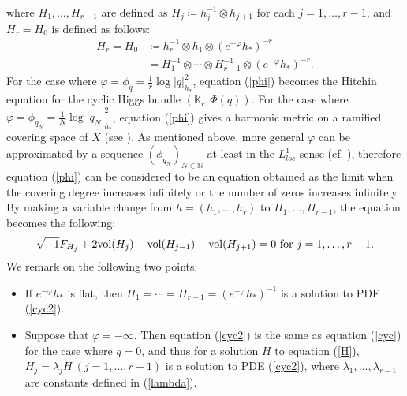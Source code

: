 \documentclass[12pt]{article}
\theoremstyle{definition}
\def\refe{\ast}
\def\vol{{\rm vol}}
\def\N{{\mathbb N}}
\def\K{{\mathbb K}}
\def\inum{{\sqrt{-1}}}
\begin{document}
where $H_1,\dots, H_{r-1}$ are defined as $H_j\coloneqq h_j^{-1}\otimes h_{j+1}$ for each $j=1,\dots, r-1$, and $H_r=H_0$ is defined as follows:
\begin{align*}
H_r = H_0 &\coloneqq h_r^{-1}\otimes h_1 \otimes (e^{-\varphi}h_\refe)^{-r} \\ 
&= H_1^{-1}\otimes \cdots \otimes H_{r-1}^{-1} \otimes (e^{-\varphi}h_\refe)^{-r}.
\end{align*}
For the case where $\varphi=\phi_q=\frac{1}{r}\log|q|_{h_\refe}^2$, equation (\ref{phi}) becomes the Hitchin equation for the cyclic Higgs bundle $(\K_r,\Phi(q))$. For the case where $\varphi=\phi_{q_N}=\frac{1}{N}\log|q_N|_{h_\refe}^2$, equation (\ref{phi}) gives a harmonic metric on a ramified covering space of $X$ (see \cite[Section 2]{Miy2}). As mentioned above, more general $\varphi$ can be approximated by a sequence $(\phi_{q_N})_{N\in\N}$ at least in the $L^1_{loc}$-sense (cf. \cite{GZ1}), therefore equation (\ref{phi}) can be considered to be an equation obtained as the limit when the covering degree increases infinitely or the number of zeros increases infinitely. By making a variable change from $h=(h_1,\dots, h_r)$ to $H_1,\dots, H_{r-1}$, the equation becomes the following:
\begin{align}
\inum F_{H_j} + 2\vol(H_j) - \vol(H_{j-1}) - \vol(H_{j+1}) = 0 \ \text{for $j=1,\dots, r-1$.}\label{cyc2}
\end{align}
We remark on the following two points:
\begin{itemize}
\item If $e^{-\varphi}h_\refe$ is flat, then $H_1=\cdots=H_{r-1}=(e^{-\varphi}h_\refe)^{-1}$ is a solution to PDE (\ref{cyc2}).
\item Suppose that $\varphi=-\infty$. Then equation (\ref{cyc2}) is the same as equation (\ref{cyc}) for the case where $q=0$, and thus for a solution $H$ to equation (\ref{H}), $H_j=\lambda_j H\ (j=1,\dots, r-1)$ is a solution to PDE (\ref{cyc2}), where $\lambda_1,\dots, \lambda_{r-1}$ are constants defined in (\ref{lambda}).
\end{itemize}
\end{document}

